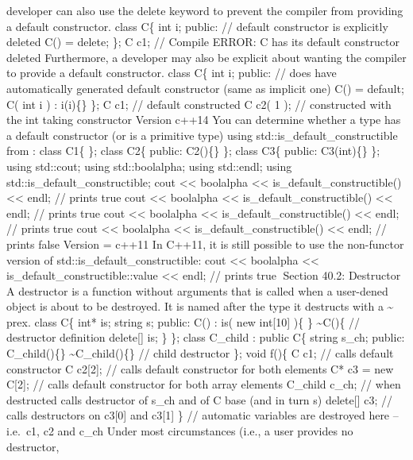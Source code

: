 developer can also use the delete keyword to prevent the compiler from
providing a default constructor. class C\{ int i; public: // default
constructor is explicitly deleted C() = delete; \}; C c1; // Compile
ERROR: C has its default constructor deleted Furthermore, a developer
may also be explicit about wanting the compiler to provide a default
constructor. class C\{ int i; public: // does have automatically
generated default constructor (same as implicit one) C() = default; C(
int i ) : i(i)\{\} \}; C c1; // default constructed C c2( 1 ); //
constructed with the int taking constructor Version c++14 You can
determine whether a type has a default constructor (or is a primitive
type) using std::is\_default\_constructible from : class C1\{ \}; class
C2\{ public: C2()\{\} \}; class C3\{ public: C3(int)\{\} \}; using
std::cout; using std::boolalpha; using std::endl; using
std::is\_default\_constructible; cout \textless\textless{} boolalpha
\textless\textless{} is\_default\_constructible() \textless\textless{}
endl; // prints true cout \textless\textless{} boolalpha
\textless\textless{} is\_default\_constructible() \textless\textless{}
endl; // prints true cout \textless\textless{} boolalpha
\textless\textless{} is\_default\_constructible() \textless\textless{}
endl; // prints true cout \textless\textless{} boolalpha
\textless\textless{} is\_default\_constructible() \textless\textless{}
endl; // prints false Version = c++11 In C++11, it is still possible to
use the non-functor version of std::is\_default\_constructible: cout
\textless\textless{} boolalpha \textless\textless{}
is\_default\_constructible::value \textless\textless{} endl; // prints
true Section 40.2: Destructor A destructor is a function without
arguments that is called when a user-dened object is about to be
destroyed. It is named after the type it destructs with a
\textasciitilde{} prex. class C\{ int* is; string s; public: C() : is(
new int{[}10{]} )\{ \} \textasciitilde C()\{ // destructor definition
delete{[}{]} is; \} \}; class C\_child : public C\{ string s\_ch;
public: C\_child()\{\} \textasciitilde C\_child()\{\} // child
destructor \}; void f()\{ C c1; // calls default constructor C
c2{[}2{]}; // calls default constructor for both elements C* c3 = new
C{[}2{]}; // calls default constructor for both array elements C\_child
c\_ch; // when destructed calls destructor of s\_ch and of C base (and
in turn s) delete{[}{]} c3; // calls destructors on c3{[}0{]} and
c3{[}1{]} \} // automatic variables are destroyed here -- i.e.~c1, c2
and c\_ch Under most circumstances (i.e., a user provides no destructor,
